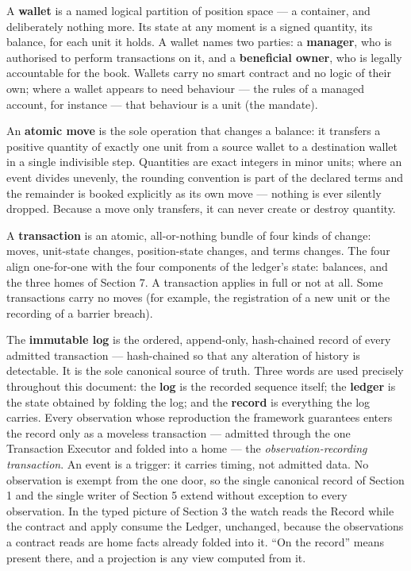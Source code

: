 \documentclass[11pt,a4paper]{article}
\newcommand{\clabel}[1]{\leavevmode\hypertarget{clause-#1}{}%
  \marginpar{\raggedright\scriptsize\ttfamily\textcolor{gray}{#1}}}
\begin{document}
\clabel{C-4.5}A \textbf{wallet} is a named logical partition of position space --- a
container, and deliberately nothing more. Its state at any moment is a
signed quantity, its balance, for each unit it holds. A wallet names two
parties: a \textbf{manager}, who is authorised to perform transactions
on it, and a \textbf{beneficial owner}, who is legally accountable for
the book. Wallets carry no smart contract and no logic of their own;
where a wallet appears to need behaviour --- the rules of a managed
account, for instance --- that behaviour is a unit (the mandate).

\clabel{C-4.6}An \textbf{atomic move} is the sole operation that changes a balance: it
transfers a positive quantity of exactly one unit from a source wallet
to a destination wallet in a single indivisible step. Quantities are
exact integers in minor units; where an event divides unevenly, the
rounding convention is part of the declared terms and the remainder is
booked explicitly as its own move --- nothing is ever silently dropped.
Because a move only transfers, it can never create or destroy quantity.

\clabel{C-4.7}A \textbf{transaction} is an atomic, all-or-nothing bundle of four kinds
of change: moves, unit-state changes, position-state changes, and terms
changes. The four align one-for-one with the four components of the
ledger's state: balances, and the three homes of Section 7. A
transaction applies in full or not at all. Some transactions carry no
moves (for example, the registration of a new unit or the recording of a
barrier breach).

\clabel{C-4.8}The \textbf{immutable log} is the ordered, append-only, hash-chained
record of every admitted transaction --- hash-chained so that any
alteration of history is detectable. It is the sole canonical source of truth. Three words are used precisely
throughout this document: the \textbf{log} is the recorded sequence itself;
the \textbf{ledger} is the state obtained by folding the log; and the
\textbf{record} is everything the log carries. Every observation whose
reproduction the framework guarantees enters the record only as a moveless
transaction --- admitted through the one Transaction Executor and folded
into a home --- the \emph{observation-recording transaction}. An event is a
trigger: it carries timing, not admitted data. No observation is exempt from
the one door, so the single canonical record of Section 1 and the single
writer of Section 5 extend without exception to every observation. In the
typed picture of Section 3 the watch reads the Record while the contract and
apply consume the Ledger, unchanged, because the observations a contract
reads are home facts already folded into it. ``On the record'' means present
there, and a projection is any view computed from it.
\end{document}
